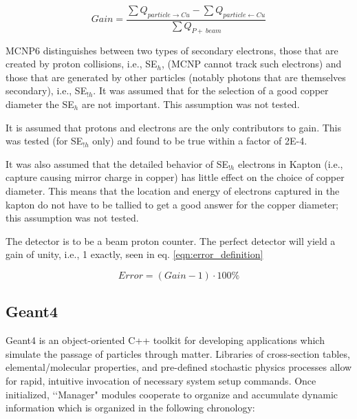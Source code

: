 \documentclass{mc2015}
\begin{document}
\begin{equation}
Gain = \frac{\sum Q_{particle\rightarrow Cu} - \sum Q_{particle\leftarrow Cu}}{\sum Q_{P+\ beam}}
\label{eqn:gain_definition}
\end{equation}

MCNP6 distinguishes between two types of secondary electrons, those that are created by proton collisions, i.e., SE$_h$, (MCNP cannot track such electrons) and those that are generated by other particles (notably photons that are themselves secondary), i.e., SE$_{!h}$. It was assumed that for the selection of a good copper diameter the SE$_h$ are not important. This assumption was not tested.

It is assumed that protons and electrons are the only contributors to gain. This was tested (for SE$_{!h}$ only) and found to be true within a factor of 2E-4.

It was also assumed that the detailed behavior of SE$_{!h}$ electrons in Kapton (i.e., capture causing mirror charge in copper) has little effect on the choice of copper diameter. This means that the location and energy of electrons captured in the kapton do not have to be tallied to get a good answer for the copper diameter; this assumption was not tested.

The detector is to be a beam proton counter. The perfect detector will yield a gain of unity, i.e., 1 exactly, seen in eq. \ref{eqn:error_definition}

\begin{equation}
Error = (Gain-1)\cdot100\%
\label{eqn:error_definition}
\end{equation}

\subsection{Geant4}

Geant4 is an object-oriented C++ toolkit for developing applications which simulate the passage of particles through matter. Libraries of cross-section tables, elemental/molecular properties, and pre-defined stochastic physics processes allow for rapid, intuitive invocation of necessary system setup commands. Once initialized, \lq\lq Manager" modules cooperate to organize and accumulate dynamic information which is organized in the following chronology:
\end{document}
